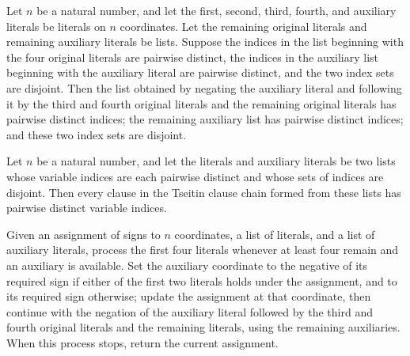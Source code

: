 \begin{theorem}
\label{FABL.tseitinStep_invariants}
\leanok
{}
Let $n$ be a natural number, and let the first, second, third, fourth, and auxiliary
literals be literals on $n$ coordinates. Let the remaining original literals and
remaining auxiliary literals be lists. Suppose the indices in the list beginning with
the four original literals are pairwise distinct, the indices in the auxiliary list
beginning with the auxiliary literal are pairwise distinct, and the two index sets are
disjoint. Then the list obtained by negating the auxiliary literal and following it by
the third and fourth original literals and the remaining original literals has pairwise
distinct indices; the remaining auxiliary list has pairwise distinct indices; and these
two index sets are disjoint.
\end{theorem}

\begin{theorem}
\label{FABL.tseitinClauseChain_nodupIndices}
\leanok
{}
Let $n$ be a natural number, and let the literals and auxiliary literals be two lists
whose variable indices are each pairwise distinct and whose sets of indices are
disjoint. Then every clause in the Tseitin clause chain formed from these lists has
pairwise distinct variable indices.
\end{theorem}

\begin{definition}
\label{FABL.fillTseitinClauseAux}
\leanok
{}
Given an assignment of signs to $n$ coordinates, a list of literals, and a list of
auxiliary literals, process the first four literals whenever at least four remain and an
auxiliary is available. Set the auxiliary coordinate to the negative of its required
sign if either of the first two literals holds under the assignment, and to its required
sign otherwise; update the assignment at that coordinate, then continue with the
negation of the auxiliary literal followed by the third and fourth original literals and
the remaining literals, using the remaining auxiliaries. When this process stops, return
the current assignment.
\end{definition}

